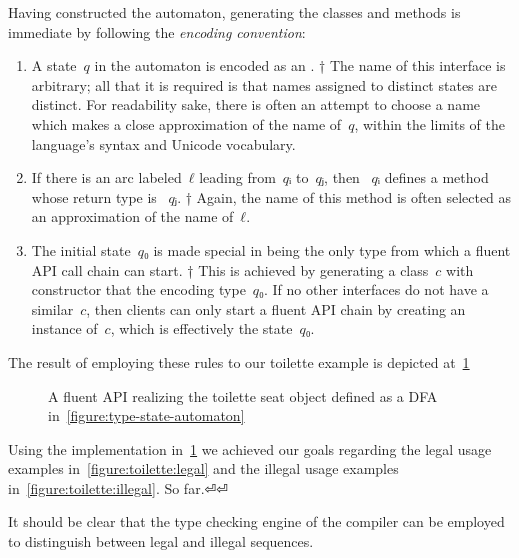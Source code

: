 Having constructed the automaton, generating the classes and methods is
immediate by following the \emph{encoding convention}:
\begin{enumerate}
  \item A state~$q$ in the automaton is encoded as an .%
        †{%
          The name of this interface is arbitrary; all that it is required is
          that names assigned to distinct states are distinct.  For readability
          sake, there is often an attempt to choose a name which makes a close
          approximation of the name of~$q$, within the limits of the language's
          syntax and Unicode vocabulary.
        }
  \item If there is an arc labeled~$ℓ$ leading from~$qᵢ$ to~$qⱼ$,
        then ~$qᵢ$ defines a
        method whose return type is ~$qⱼ$.%
        †{%
          Again, the name of this method is often selected as an approximation
          of the name of~$ℓ$.
        }
  \item The initial state~$q₀$ is made special in being the only type from
        which a fluent API call chain can start.%
        †{%
          This is achieved by generating a class~$c$ with 
          constructor that  the  encoding
          type~$q₀$.  If no other interfaces do not have a similar~$c$, then
          clients can only start a fluent API chain by creating an instance
          of~$c$, which is
          effectively the state~$q₀$.
        }
\end{enumerate}

The result of employing these rules to our toilette example is depicted
at~\cref{figure:toilette-types}

\begin{figure}
  \caption{\label{figure:toilette-types}
    A fluent API realizing the toilette seat object defined as a DFA
    in~\cref{figure:type-state-automaton}}
\end{figure}

Using the implementation in~\cref{figure:toilette-types} we achieved
our goals regarding the legal usage examples in~\cref{figure:toilette:legal}
and the illegal usage examples in~\cref{figure:toilette:illegal}.
So far.⏎⏎

It should be clear that the type checking engine of the compiler can
be employed to distinguish between legal and illegal sequences.

